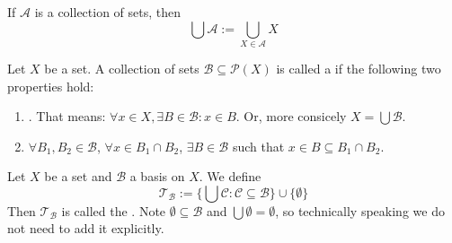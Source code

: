 \documentclass[12pt, a4paper, oneside, openright, titlepage]{book}
\begin{document}
\begin{rmk}
    If $\mathcal{A}$ is a collection of sets, then \begin{equation*}
        \bigcup\mathcal{A} := \bigcup\limits_{X\in\mathcal{A}}X
    \end{equation*}
\end{rmk}


\begin{defn}
    Let $X$ be a set. A collection of sets $\mathcal{B} \subseteq \mathcal{P}(X)$ is called a  if the following two properties hold:\begin{enumerate}
        \item {}. That means: $\forall x \in X, \exists B \in \mathcal{B}: x\in B$. Or, more consicely $X = \bigcup\mathcal{B}$.
        \item $\forall B_1,B_2 \in \mathcal{B}$, $\forall x \in B_1\cap B_2$, $\exists B \in \mathcal{B}$ such that $x \in B \subseteq B_1\cap B_2$.
    \end{enumerate}
\end{defn}


\begin{defn}
    Let $X$ be a set and $\mathcal{B}$ a basis on $X$. We define \begin{equation*}
        \mathcal{T}_{\mathcal{B}} :=\{\bigcup \mathcal{C}:\mathcal{C}\subseteq \mathcal{B}\}\cup\{\emptyset\}
    \end{equation*}
    Then $\mathcal{T}_{\mathcal{B}}$ is called the . Note $\emptyset \subseteq \mathcal{B}$ and $\bigcup\emptyset = \emptyset$, so technically speaking we do not need to add it explicitly.
\end{defn}
\end{document}
